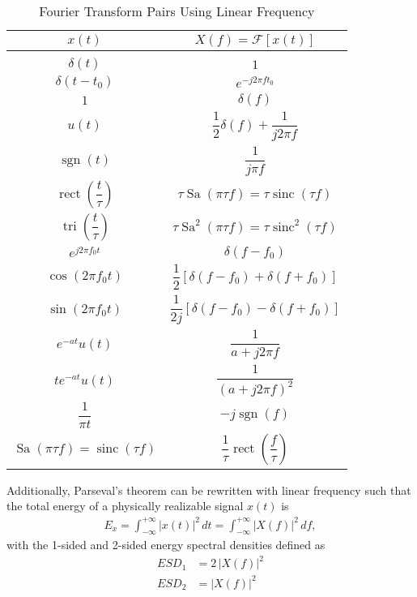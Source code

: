 \documentclass{report}
\begin{document}
\begin{table}[!hbt]
    \centering
    \caption{Fourier Transform Pairs Using Linear Frequency}
    \label{linear_fourier_pairs}
    \begin{tabular}{|c|c|}
        \hline
        $x(t)$ & $X(f)=\mathcal{F}[x(t)]$ \\[0.15cm]
        \hline
        & \\[0.1cm]
        $\delta(t)$ & $1$ \\[0.5cm]
        $\delta(t-t_0)$ & $e^{-j2\pi ft_0}$ \\[0.5cm]
        $1$ & $\delta(f)$ \\[0.5cm]
        $u(t)$ & $\dfrac{1}{2}\delta(f) + \dfrac{1}{j2\pi f}$ \\[0.5cm]
        $\operatorname{sgn}(t)$ & $\dfrac{1}{j\pi f}$ \\[0.5cm]
        $\operatorname{rect}\left(\dfrac{t}{\tau}\right)$ & $\tau\operatorname{Sa}(\pi\tau f) = \tau\operatorname{sinc}(\tau f)$ \\[0.5cm]
        $\operatorname{tri}\left(\dfrac{t}{\tau}\right)$ & $\tau\operatorname{Sa}^2(\pi\tau f) = \tau\operatorname{sinc}^2(\tau f)$ \\[0.5cm]
        $e^{j2\pi f_0 t}$ & $\delta(f-f_0)$ \\[0.5cm]
        $\cos(2\pi f_0 t)$ & $\dfrac{1}{2}[\delta(f-f_0) + \delta(f+f_0)]$ \\[0.5cm]
        $\sin(2\pi f_0 t)$ & $\dfrac{1}{2j}[\delta(f-f_0) - \delta(f+f_0)]$ \\[0.5cm]
        $e^{-at}u(t)$ & $\dfrac{1}{a+j2\pi f}$ \\[0.5cm]
        $te^{-at}u(t)$ & $\dfrac{1}{(a+j2\pi f)^2}$ \\[0.5cm]
        $\dfrac{1}{\pi t}$ & $-j \operatorname{sgn}(f)$ \\[0.5cm]
        $\operatorname{Sa}(\pi\tau f) = \operatorname{sinc}(\tau f)$ & $\dfrac{1}{\tau}\operatorname{rect}\left(\dfrac{f}{\tau}\right)$ \\[0.5cm]
        \hline
    \end{tabular}
\end{table}
\newpage
\noindent Additionally, Parseval's theorem can be rewritten with linear frequency such that the total energy of a physically realizable signal $x(t)$ is 
\begin{align}
    E_x = \int_{-\infty}^{+\infty} |x(t)|^2 \,dt = \int_{-\infty}^{+\infty} |X(f)|^2 \,df,
\end{align}
with the 1-sided and 2-sided energy spectral densities defined as 
\begin{align*}
    ESD_1 &= 2\,|X(f)|^2 \\
    ESD_2 &= |X(f)|^2
\end{align*} 
\end{document}

